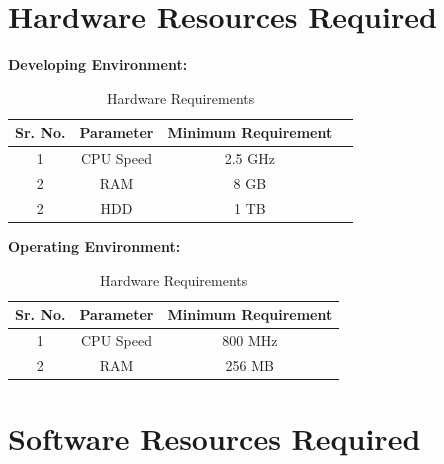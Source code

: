 \documentclass[11pt,fleqn]{book} %
\begin{document}
\section{Hardware Resources Required}
\textbf{Developing Environment:} \\
\begin{table}[!htbp]
\begin{center}
\def\arraystretch{1.5}
  \begin{tabular}{| c | c | c | c |}
\hline
Sr. No. &	Parameter &	Minimum Requirement  \\
\hline
1 &	CPU Speed &	 2.5 GHz   \\
\hline
2 &	RAM  &	8 GB  \\
\hline 

2 &	HDD  &	1 TB  \\
\hline 

\end{tabular}
 \caption { Hardware Requirements }
 \label{tab:hreq}
\end{center}
\end{table}

\textbf{Operating Environment:} \\
\begin{table}[!htbp]
\begin{center}
\def\arraystretch{1.5}
  \begin{tabular}{| c | c | c | }
\hline
Sr. No. &	Parameter &	Minimum Requirement  \\
\hline
1 &	CPU Speed &	 800 MHz \\
\hline
2 &	RAM  & 256 MB  \\
 \hline 

 

\end{tabular}
 \caption { Hardware Requirements }
 \label{tab:hreq}
\end{center}

\end{table}

\section{Software Resources Required}
\end{document}
